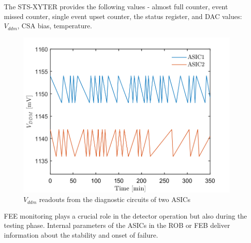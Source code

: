 The STS-XYTER provides the following values - almost full counter, event missed counter, single event upset counter, the status register, and \gls{DAC} values: $V_{ddm}$, \gls{CSA} bias, temperature. 

\begin{figure}[!h]
    \centering
    \includegraphics[width=0.65\columnwidth]{Chapter4/images/FEB.png}
    \caption{$V_{ddm}$ readouts from the diagnostic circuits of two ASICs}
    \label{fig:vddm_first}
\end{figure}

FEE monitoring plays a crucial role in the detector operation but also during the testing phase. Internal parameters of the ASICs in the \gls{ROB} or \gls{FEB} deliver information about the stability and onset of failure. %
